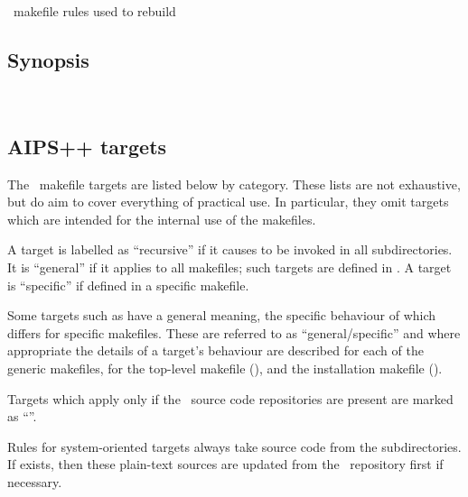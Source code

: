 \gnu\ makefile rules used to rebuild \aipspp
 
\subsection*{Synopsis}
 
\begin{synopsis}
   \\
\end{synopsis}
 
\subsection*{AIPS++ targets}

The \aipspp\ makefile targets are listed below by category.  These lists are
not exhaustive, but do aim to cover everything of practical use.  In
particular, they omit targets which are intended for the internal use of the
makefiles.

A target is labelled as ``recursive'' if it causes  to be
invoked in all subdirectories.  It is ``general'' if it applies to all
makefiles; such targets are defined in .  A target is
``specific'' if defined in a specific makefile.

Some targets such as  have a general meaning, the specific
behaviour of which differs for specific makefiles.  These are referred to as
``general/specific'' and where appropriate the details of a target's behaviour
are described for each of the generic makefiles, for the top-level makefile
(), and the installation makefile ().

Targets which apply only if the \rcs\ source code repositories are present are
marked as ``\rcs''.

Rules for system-oriented targets always take source code from the
 subdirectories.  If  exists, then these
plain-text sources are updated from the \rcs\ repository first if necessary.

